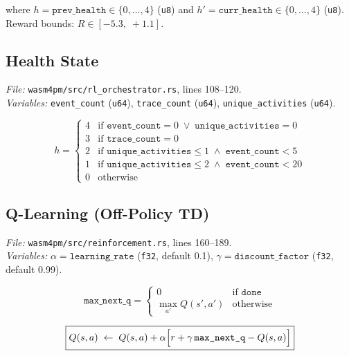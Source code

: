 \documentclass[11pt,a4paper]{article}
\begin{document}
where $h = \texttt{prev\_health}\in\{0,\ldots,4\}$ (\texttt{u8}) and
$h' = \texttt{curr\_health}\in\{0,\ldots,4\}$ (\texttt{u8}).
Reward bounds: $R \in [-5.3,\; +1.1]$.

\subsection{Health State}
\textit{File:} \texttt{wasm4pm/src/rl\_orchestrator.rs}, lines 108--120.\\
\textit{Variables:} \texttt{event\_count} (\texttt{u64}), \texttt{trace\_count} (\texttt{u64}), \texttt{unique\_activities} (\texttt{u64}).

\begin{equation}
  h =
  \begin{cases}
    4 & \text{if } \texttt{event\_count}=0 \;\vee\; \texttt{unique\_activities}=0 \\
    3 & \text{if } \texttt{trace\_count}=0 \\
    2 & \text{if } \texttt{unique\_activities}\leq 1 \;\wedge\; \texttt{event\_count}<5 \\
    1 & \text{if } \texttt{unique\_activities}\leq 2 \;\wedge\; \texttt{event\_count}<20 \\
    0 & \text{otherwise}
  \end{cases}
\end{equation}

\subsection{Q-Learning (Off-Policy TD)}
\textit{File:} \texttt{wasm4pm/src/reinforcement.rs}, lines 160--189.\\
\textit{Variables:} $\alpha=\texttt{learning\_rate}$ (\texttt{f32}, default 0.1), $\gamma=\texttt{discount\_factor}$ (\texttt{f32}, default 0.99).

\begin{equation}
  \texttt{max\_next\_q} =
  \begin{cases}
    0 & \text{if } \texttt{done} \\
    \max_{a'} Q(s',a') & \text{otherwise}
  \end{cases}
\end{equation}

\begin{equation}
  \boxed{Q(s,a) \;\leftarrow\; Q(s,a) + \alpha\Bigl[r + \gamma\,\texttt{max\_next\_q} - Q(s,a)\Bigr]}
\end{equation}
\end{document}
